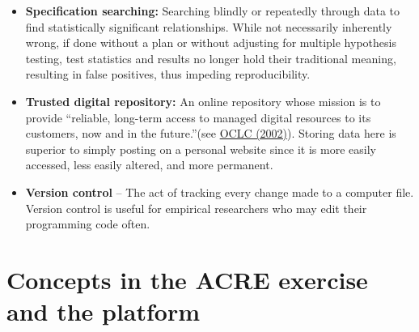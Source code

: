 \documentclass[
]{book}
\begin{document}
\begin{itemize}
\item
  \textbf{Specification searching:} Searching blindly or repeatedly through data to find statistically significant relationships. While not necessarily inherently wrong, if done without a plan or without adjusting for multiple hypothesis testing, test statistics and results no longer hold their traditional meaning, resulting in false positives, thus impeding reproducibility.\\
\item
  \textbf{Trusted digital repository:} An online repository whose mission is to provide ``reliable, long-term access to managed digital resources to its customers, now and in the future.''(see \href{https://www.oclc.org/research/archive/projects/trustedrep.html}{OCLC (2002)}). Storing data here is superior to simply posting on a personal website since it is more easily accessed, less easily altered, and more permanent.\\
\item
  \textbf{Version control} -- The act of tracking every change made to a computer file. Version control is useful for empirical researchers who may edit their programming code often.
\end{itemize}

\hypertarget{concepts-in-the-acre-exercise-and-the-platform}{%
\section{Concepts in the ACRE exercise and the platform}\label{concepts-in-the-acre-exercise-and-the-platform}}
\end{document}
